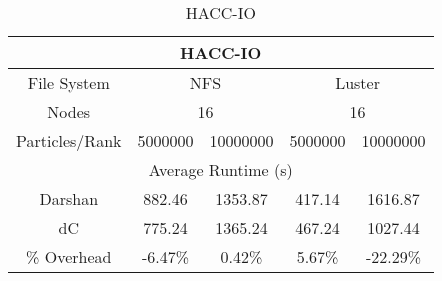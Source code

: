 \begin{table}[h]
\begin{subtable}[h]{0.45\textwidth}
    \end{subtable}
    \begin{subtable}[h]{0.45\textwidth}
        \centering
        \setlength\tabcolsep{3pt}
        \begin{tabular}{|ccccc|}
        \hline
        \multicolumn{5}{|c|}{HACC-IO}                                                                                                                                  \\ \hline
        \multicolumn{1}{|c|}{File System}      & \multicolumn{2}{c|}{NFS}                                            & \multicolumn{2}{c|}{Luster}                     \\ \hline
        \multicolumn{1}{|c|}{Nodes}            & \multicolumn{2}{c|}{16}                                             & \multicolumn{2}{c|}{16}                         \\ \hline
        \multicolumn{1}{|c|}{Particles/Rank}   & \multicolumn{1}{c|}{5000000}     & \multicolumn{1}{c|}{10000000}    & \multicolumn{1}{c|}{5000000}     & 10000000     \\ \hline
        \multicolumn{5}{|c|}{Average Runtime (s)}                                                                                                                          \\ \hline
        \multicolumn{1}{|c|}{Darshan}          & \multicolumn{1}{c|}{882.46} & \multicolumn{1}{c|}{1353.87} & \multicolumn{1}{c|}{417.14} & 1616.87  \\ \hline
        \multicolumn{1}{|c|}{dC} & \multicolumn{1}{c|}{775.24} & \multicolumn{1}{c|}{1365.24} & \multicolumn{1}{c|}{467.24} & 1027.44  \\ \hline
        \multicolumn{1}{|c|}{\% Overhead}      & \multicolumn{1}{c|}{-6.47\%} & \multicolumn{1}{c|}{0.42\%} & \multicolumn{1}{c|}{5.67\%}  & -22.29\% \\ \hline
        \end{tabular}
    \caption{HACC-IO} 
    \label{subtable:HACC}
    \vspace{0.5cm}
    \end{subtable}
    

\end{table}
